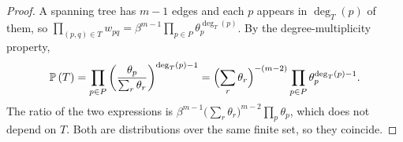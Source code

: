 \documentclass[10pt,a4paper]{amsart}
\renewcommand{\Pr}[1]{\mathbb{P}\left(#1\right)}
\begin{document}
\begin{proof}
A spanning tree has $m-1$ edges and each $p$ appears in $\deg_T(p)$ of
them, so
$\prod_{(p,q)\in T}w_{pq}
 =\beta^{m-1}\prod_{p\in P}\theta_p^{\deg_T(p)}$.
By the degree-multiplicity property,
\[
\Pr{T}=\prod_{p\in P}
\left(\frac{\theta_p}{\sum_{r}\theta_r}\right)^{\deg_T(p)-1}
=\Bigl(\sum_{r}\theta_r\Bigr)^{-(m-2)}
\prod_{p\in P}\theta_p^{\deg_T(p)-1}.
\]
The ratio of the two expressions is
$\beta^{m-1}\bigl(\sum_r\theta_r\bigr)^{m-2}\prod_{p}\theta_p$, which
does not depend on $T$. Both are distributions over the same finite
set, so they coincide.
\end{proof}
\end{document}
